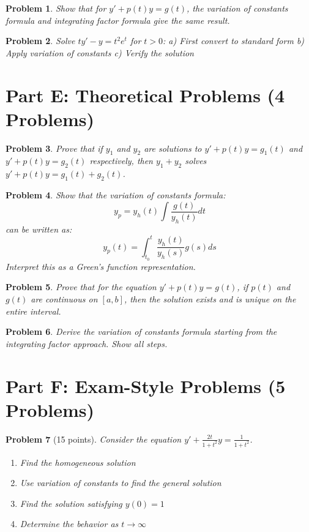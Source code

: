 \documentclass[12pt]{article}
\newtheorem{problem}{Problem}
\begin{document}
\begin{problem}
Show that for $y' + p(t)y = g(t)$, the variation of constants formula and integrating factor formula give the same result.
\end{problem}

\begin{problem}
Solve $ty' - y = t^2e^t$ for $t > 0$:
a) First convert to standard form
b) Apply variation of constants
c) Verify the solution
\end{problem}

\section*{Part E: Theoretical Problems (4 Problems)}

\begin{problem}
Prove that if $y_1$ and $y_2$ are solutions to $y' + p(t)y = g_1(t)$ and $y' + p(t)y = g_2(t)$ respectively, then $y_1 + y_2$ solves $y' + p(t)y = g_1(t) + g_2(t)$.
\end{problem}

\begin{problem}
Show that the variation of constants formula:
\[y_p = y_h(t) \int \frac{g(t)}{y_h(t)}dt\]
can be written as:
\[y_p(t) = \int_{t_0}^t \frac{y_h(t)}{y_h(s)} g(s) ds\]
Interpret this as a Green's function representation.
\end{problem}

\begin{problem}
Prove that for the equation $y' + p(t)y = g(t)$, if $p(t)$ and $g(t)$ are continuous on $[a,b]$, then the solution exists and is unique on the entire interval.
\end{problem}

\begin{problem}
Derive the variation of constants formula starting from the integrating factor approach. Show all steps.
\end{problem}

\section*{Part F: Exam-Style Problems (5 Problems)}

\begin{problem}[15 points]
Consider the equation $y' + \frac{2t}{1+t^2}y = \frac{1}{1+t^2}$.
\begin{enumerate}
    \item Find the homogeneous solution
    \item Use variation of constants to find the general solution
    \item Find the solution satisfying $y(0) = 1$
    \item Determine the behavior as $t \to \infty$
\end{enumerate}
\end{problem}
\end{document}
